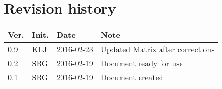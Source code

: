 \chapter*{Revision history}
\label{app:rev_his}

\renewcommand\arraystretch{1.5}
\begin{tabular}{b{1cm} b{1cm} b{2cm} b{8cm}}
    \textbf{Ver.} & \textbf{Init.} & \textbf{Date} & \textbf{Note} \\
    \hline
    0.9 & KLJ & 2016-02-23 & Updated Matrix after corrections \\
    \hline
    0.2 & SBG & 2016-02-19 & Document ready for use \\
    \hline
    0.1 & SBG & 2016-02-19 & Document created \\
\end{tabular}
\renewcommand\arraystretch{1}